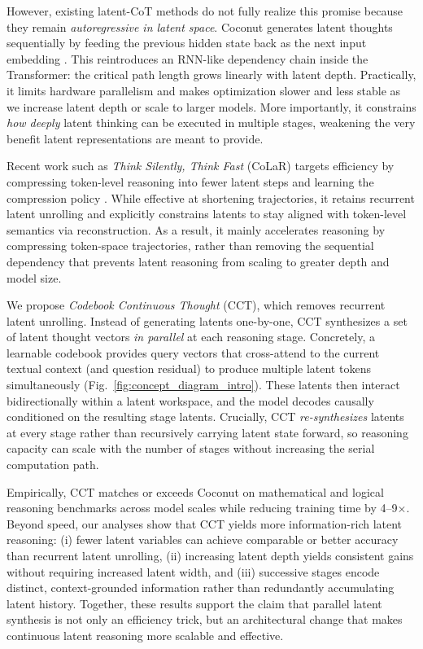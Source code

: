 However, existing latent-CoT methods do not fully realize this promise because they remain \emph{autoregressive in latent space}. Coconut generates latent thoughts sequentially by feeding the previous hidden state back as the next input embedding \cite{paper1}. This reintroduces an RNN-like dependency chain inside the Transformer: the critical path length grows linearly with latent depth. Practically, it limits hardware parallelism and makes optimization slower and less stable as we increase latent depth or scale to larger models. More importantly, it constrains \emph{how deeply} latent thinking can be executed in multiple stages, weakening the very benefit latent representations are meant to provide.

Recent work such as \emph{Think Silently, Think Fast} (CoLaR) targets efficiency by compressing token-level reasoning into fewer latent steps and learning the compression policy \cite{paper2}. While effective at shortening trajectories, it retains recurrent latent unrolling and explicitly constrains latents to stay aligned with token-level semantics via reconstruction. As a result, it mainly accelerates reasoning by compressing token-space trajectories, rather than removing the sequential dependency that prevents latent reasoning from scaling to greater depth and model size.

We propose \emph{Codebook Continuous Thought} (CCT), which removes recurrent latent unrolling. Instead of generating latents one-by-one, CCT synthesizes a set of latent thought vectors \emph{in parallel} at each reasoning stage. Concretely, a learnable codebook provides query vectors that cross-attend to the current textual context (and question residual) to produce multiple latent tokens simultaneously (Fig.~\ref{fig:concept_diagram_intro}). These latents then interact bidirectionally within a latent workspace, and the model decodes causally conditioned on the resulting stage latents. Crucially, CCT \emph{re-synthesizes} latents at every stage rather than recursively carrying latent state forward, so reasoning capacity can scale with the number of stages without increasing the serial computation path.

Empirically, CCT matches or exceeds Coconut on mathematical and logical reasoning benchmarks across model scales while reducing training time by 4--9$\times$. Beyond speed, our analyses show that CCT yields more information-rich latent reasoning: (i) fewer latent variables can achieve comparable or better accuracy than recurrent latent unrolling, (ii) increasing latent depth yields consistent gains without requiring increased latent width, and (iii) successive stages encode distinct, context-grounded information rather than redundantly accumulating latent history. Together, these results support the claim that parallel latent synthesis is not only an efficiency trick, but an architectural change that makes continuous latent reasoning more scalable and effective.

